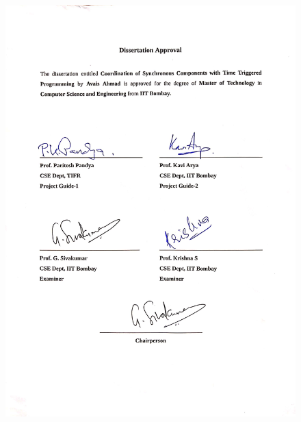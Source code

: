 \documentclass[16pt]{report}
\begin{document}
\begin{figure}[H]
\centering
\includegraphics[width=\linewidth]{declaration.jpg}
\end{figure}
\end{document}
